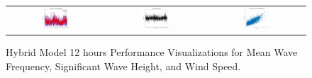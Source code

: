 \begin{figure}[ht!]
\begin{tabular}{ccc}
    \includegraphics[width=0.32\textwidth]{graphs/hybrid/12 hours/wind_speed/actual vs forecast.jpg} &
    \includegraphics[width=0.32\textwidth]{graphs/hybrid/12 hours/wind_speed/residuals wind speed.jpg} &
    \includegraphics[width=0.32\textwidth]{graphs/hybrid/12 hours/wind_speed/scatter plot.jpg} \\
  \end{tabular}
  \caption{Hybrid Model 12 hours Performance Visualizations for Mean Wave Frequency, Significant Wave Height, and Wind Speed.}
  \label{fig:hybrid_12_hours}
\end{figure}

